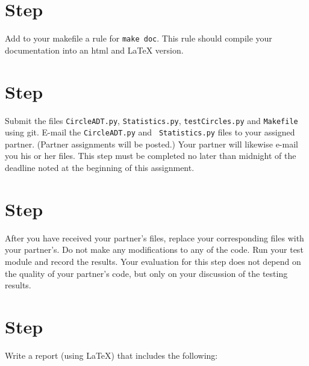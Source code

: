 \documentclass[12pt]{article}
\newcounter{stepnum}
\begin{document}
\section *{Step  \thestepnum}

Add to your makefile a rule for {\tt make doc}.  This rule should compile your
documentation into an html and LaTeX version.

\section *{Step  \thestepnum}

Submit the files {\tt CircleADT.py}, {\tt Statistics.py}, {\tt testCircles.py}
and {\tt Makefile} using git.  E-mail the {\tt CircleADT.py} and {\tt
  Statistics.py} files to your assigned
partner.  (Partner assignments will be posted.)  Your partner will
likewise e-mail you his or her files.  This step must be completed no later than
midnight of the deadline noted at the beginning of this assignment.

\section *{Step  \thestepnum}

After you have received your partner's files, replace your corresponding files
with your partner's.  Do not make any modifications to any of the code.  Run
your test module and record the results.  Your evaluation for this step does not
depend on the quality of your partner's code, but only on your discussion of the
testing results.

\section *{Step  \thestepnum}

Write a report (using LaTeX) that includes the following:
\end{document}
